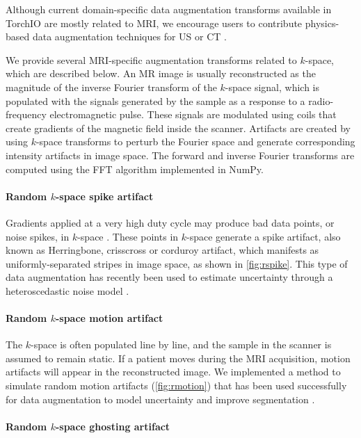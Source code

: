 Although current domain-specific data augmentation transforms available
in TorchIO are mostly related to \ac{MRI},
we encourage users to contribute physics-based data augmentation
techniques for \ac{US} or \ac{CT} \cite{omigbodun_effects_2019}.


We provide several \ac{MRI}-specific augmentation transforms
related to $k$-space, which are described below.
%
An MR image is usually reconstructed as the magnitude
of the inverse Fourier transform of the $k$-space signal, which is populated with
the signals generated by the sample
as a response to a radio-frequency electromagnetic pulse.
%
These signals are modulated using coils that create gradients of the magnetic
field inside the scanner.
%
Artifacts are created by using $k$-space transforms to perturb the Fourier space
and generate corresponding intensity artifacts in image space.
%
The forward and inverse Fourier transforms are computed using the
\ac{FFT} algorithm implemented in NumPy.


\paragraph{Random $k$-space spike artifact}

Gradients applied at a very high duty cycle may produce bad
data points, or noise spikes, in $k$-space \cite{zhuo_mr_2006}.
%
These points in $k$-space generate a spike artifact,
also known as Herringbone, crisscross or corduroy artifact,
which manifests as uniformly-separated stripes in image space,
as shown in \cref{fig:rspike}.
%
This type of data augmentation has recently been used to estimate uncertainty
through a heteroscedastic noise model \cite{shaw_heteroscedastic_2020}.


\paragraph{Random $k$-space motion artifact}

The $k$-space is often populated line by line,
and the sample in the scanner is assumed to remain static.
%
If a patient moves during the \ac{MRI} acquisition, motion artifacts will appear
in the reconstructed image.
%
We implemented a method to simulate random motion artifacts
(\cref{fig:rmotion}) that has been used successfully for data augmentation
to model uncertainty and improve segmentation \cite{shaw_mri_2019}.


\paragraph{Random $k$-space ghosting artifact}

